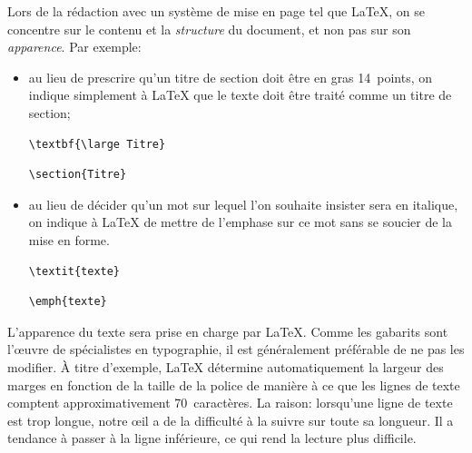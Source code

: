 Lors de la rédaction avec un système de mise en page tel que {\LaTeX},
on se concentre sur le contenu et la \emph{structure} du document, et
non pas sur son \emph{apparence}. Par exemple:
\begin{itemize}
\item au lieu de prescrire qu'un titre de section doit être en gras
  14~points, on indique simplement à {\LaTeX} que le texte doit être
  traité comme un titre de section;
  \begin{demo}
    \begin{minipage}{0.45\linewidth}
\begin{lstlisting}
\textbf{\large Titre}
\end{lstlisting}
    \end{minipage}
    \hfill \faArrowRight \hfill
    \begin{minipage}{0.45\linewidth}
\begin{lstlisting}
\section{Titre}
\end{lstlisting}
    \end{minipage}
  \end{demo}
\item au lieu de décider qu'un mot sur lequel l'on souhaite insister
  sera en italique, on indique à {\LaTeX} de mettre de l'emphase sur
  ce mot sans se soucier de la mise en forme.
  \begin{demo}
    \begin{minipage}{0.45\linewidth}
\begin{lstlisting}
\textit{texte}
\end{lstlisting}
    \end{minipage}
    \hfill \faArrowRight \hfill
    \begin{minipage}{0.45\linewidth}
\begin{lstlisting}
\emph{texte}
\end{lstlisting}
    \end{minipage}
  \end{demo}
\end{itemize}

L'apparence du texte sera prise en charge par {\LaTeX}. Comme les
gabarits sont l'{\oe}uvre de spécialistes en typographie, il est
généralement préférable de ne pas les modifier. À titre d'exemple,
{\LaTeX} détermine automatiquement la largeur des marges en fonction
de la taille de la police de manière à ce que les lignes de texte
comptent approximativement 70~caractères. La raison: lorsqu'une ligne
de texte est trop longue, notre {\oe}il a de la difficulté à la suivre
sur toute sa longueur. Il a tendance à passer à la ligne inférieure,
ce qui rend la lecture plus difficile.


